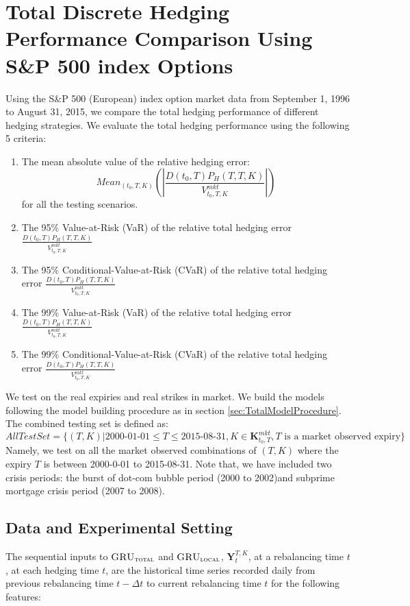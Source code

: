 \documentclass[letterpaper,12pt,titlepage,oneside,final]{book}
\numberwithin{equation}{section}
\theoremstyle{definition}
\newcommand{\modelT}{\textsc{GRU}_{\textsc{total}}}
\newcommand{\modelL}{\textsc{GRU}_{\textsc{local}}}
\newcommand{\DT}{\Delta t}
\newcommand{\Vmkt}{V^{mkt}}
\begin{document}
\section{Total Discrete Hedging Performance Comparison Using  S\&P 500 index Options}
Using the S\&P 500  ({European})  index option market data from September 1, 1996 to August 31, 2015,
we  compare the total hedging performance of different hedging strategies.
We evaluate the total hedging performance using the following 5 criteria:
\begin{enumerate}
	\item The mean absolute value of the relative hedging error:
	\[
	Mean_{(t_0,T,K)}\left(\left|\frac{D(t_0,T)  P_H(T,T,K)}{\Vmkt_{t_0,T,K}}\right|\right)
	\] for all the testing scenarios.
	\item The 95\% Value-at-Risk (VaR) of the relative total hedging error $\frac{D(t_0,T) P_H(T,T,K)}{\Vmkt_{t_0,T,K}}$
	\item The 95\% Conditional-Value-at-Risk (CVaR) of the relative total hedging error $\frac{D(t_0,T) P_H(T,T,K)}{\Vmkt_{t_0,T,K}}$
	\item The 99\% Value-at-Risk (VaR) of the relative total hedging error $\frac{D(t_0,T) P_H(T,T,K)}{\Vmkt_{t_0,T,K}}$
	\item The 99\% Conditional-Value-at-Risk (CVaR) of the relative total hedging error $\frac{D(t_0,T) P_H(T,T,K)}{\Vmkt_{t_0,T,K}}$
\end{enumerate}

We test on the real expiries and real strikes in market. We build the models following the model building procedure as in section \ref{sec:TotalModelProcedure}.  The combined testing set is defined as:
\[
AllTestSet=\{(T,K)|\text{2000-01-01}\leq T \leq \text{2015-08-31},K \in \mathbf{K}^{mkt}_{t_0,T}, T \text{ is a market observed expiry}\}
\]
Namely, we test on all the market observed combinations of $(T,K)$ where the expiry $T$ is between 2000-0-01 to 2015-08-31. Note that, we have included two crisis periods: the burst of dot-com bubble  period (2000 to 2002)and subprime mortgage crisis period (2007 to 2008).
\subsection{Data and Experimental Setting}
The sequential inputs to $\modelT$ and $\modelL$, $\mathbf{Y}_{t}^{T,K}$, at a rebalancing time $t$, at each hedging time $t$, are the historical time series recorded daily from previous rebalancing time $t-\DT$ to current rebalancing time $t$ for the following features:
\end{document}
